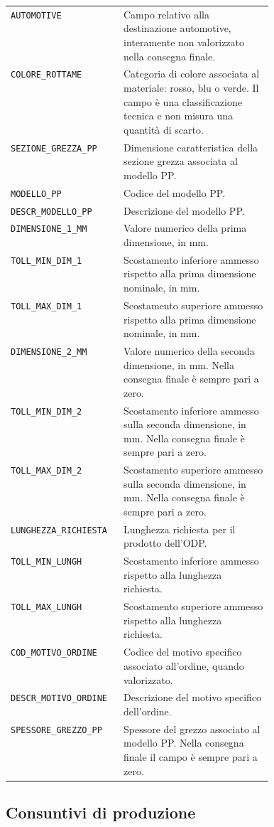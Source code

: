 \begin{longtable}{@{}p{0.43\linewidth}p{}@{}}
\texttt{AUTOMOTIVE} & Campo relativo alla destinazione automotive, interamente non valorizzato nella consegna finale. \\
\texttt{COLORE\_ROTTAME} & Categoria di colore associata al materiale: rosso, blu o verde. Il campo è una classificazione tecnica e non misura una quantità di scarto. \\
\texttt{SEZIONE\_GREZZA\_PP} & Dimensione caratteristica della sezione grezza associata al modello PP. \\
\texttt{MODELLO\_PP} & Codice del modello PP. \\
\texttt{DESCR\_MODELLO\_PP} & Descrizione del modello PP. \\
\texttt{DIMENSIONE\_1\_MM} & Valore numerico della prima dimensione, in mm. \\
\texttt{TOLL\_MIN\_DIM\_1} & Scostamento inferiore ammesso rispetto alla prima dimensione nominale, in mm. \\
\texttt{TOLL\_MAX\_DIM\_1} & Scostamento superiore ammesso rispetto alla prima dimensione nominale, in mm. \\
\texttt{DIMENSIONE\_2\_MM} & Valore numerico della seconda dimensione, in mm. Nella consegna finale è sempre pari a zero. \\
\texttt{TOLL\_MIN\_DIM\_2} & Scostamento inferiore ammesso sulla seconda dimensione, in mm. Nella consegna finale è sempre pari a zero. \\
\texttt{TOLL\_MAX\_DIM\_2} & Scostamento superiore ammesso sulla seconda dimensione, in mm. Nella consegna finale è sempre pari a zero. \\
\texttt{LUNGHEZZA\_RICHIESTA} & Lunghezza richiesta per il prodotto dell'ODP. \\
\texttt{TOLL\_MIN\_LUNGH} & Scostamento inferiore ammesso rispetto alla lunghezza richiesta. \\
\texttt{TOLL\_MAX\_LUNGH} & Scostamento superiore ammesso rispetto alla lunghezza richiesta. \\
\texttt{COD\_MOTIVO\_ORDINE} & Codice del motivo specifico associato all'ordine, quando valorizzato. \\
\texttt{DESCR\_MOTIVO\_ORDINE} & Descrizione del motivo specifico dell'ordine. \\
\texttt{SPESSORE\_GREZZO\_PP} & Spessore del grezzo associato al modello PP. Nella consegna finale il campo è sempre pari a zero. \\
\end{longtable}
\endgroup

\subsection{Consuntivi di produzione}
\label{sec:production-records-data}

